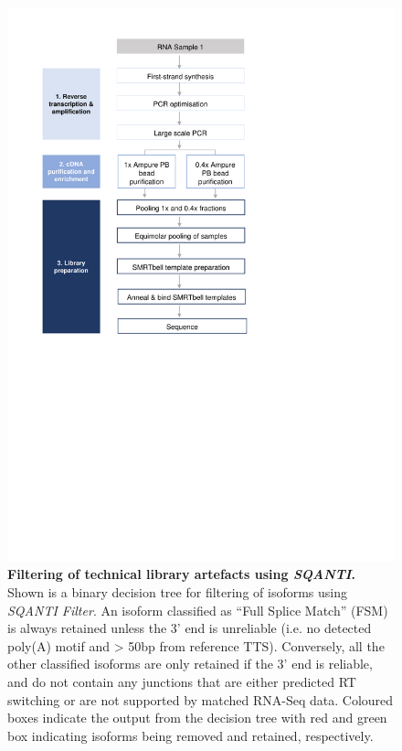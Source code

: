 \begin{figure}[!h]
	\begin{center}
		\includegraphics[page=19,trim={0 12cm 0 0},clip, scale = 0.8]{Figures/ProjectDevelopment_Figures.pdf}
	\end{center}
	\captionsetup{width=0.95\textwidth}
	\caption[Filtering of technical library artefacts using \textit{SQANTI}]%
	{\textbf{Filtering of technical library artefacts using \textit{SQANTI}.} Shown is a binary decision tree for filtering of isoforms using \textit{SQANTI Filter}. An isoform classified as “Full Splice Match” (FSM) is always retained unless the 3' end is unreliable (i.e. no detected poly(A) motif and > 50bp from reference TTS). Conversely, all the other classified isoforms are only retained if the 3' end is reliable, and do not contain any junctions that are either predicted RT switching or are not supported by matched RNA-Seq data. Coloured boxes indicate the output from the decision tree with red and green box indicating isoforms being removed and retained, respectively.}
	\label{fig:sqantifiltering}
\end{figure}

